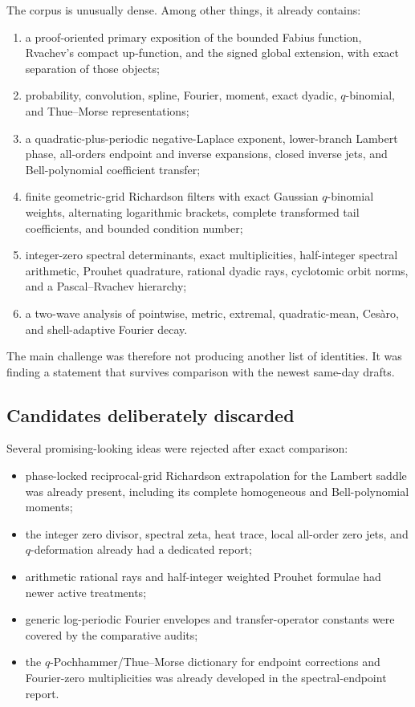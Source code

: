 \documentclass[11pt]{article}
\numberwithin{equation}{section}
\theoremstyle{definition}
\theoremstyle{remark}
\begin{document}
The corpus is unusually dense.  Among other things, it already contains:
\begin{enumerate}
\item a proof-oriented primary exposition of the bounded Fabius function, Rvachev's compact
      up-function, and the signed global extension, with exact separation of those objects;
\item probability, convolution, spline, Fourier, moment, exact dyadic, $q$-binomial, and
      Thue--Morse representations;
\item a quadratic-plus-periodic negative-Laplace exponent, lower-branch Lambert phase,
      all-orders endpoint and inverse expansions, closed inverse jets, and Bell-polynomial
      coefficient transfer;
\item finite geometric-grid Richardson filters with exact Gaussian $q$-binomial weights,
      alternating logarithmic brackets, complete transformed tail coefficients, and bounded
      condition number;
\item integer-zero spectral determinants, exact multiplicities, half-integer spectral
      arithmetic, Prouhet quadrature, rational dyadic rays, cyclotomic orbit norms, and a
      Pascal--Rvachev hierarchy;
\item a two-wave analysis of pointwise, metric, extremal, quadratic-mean, Ces\`aro, and
      shell-adaptive Fourier decay.
\end{enumerate}
The main challenge was therefore not producing another list of identities.  It was finding a
statement that survives comparison with the newest same-day drafts.

\subsection{Candidates deliberately discarded}

Several promising-looking ideas were rejected after exact comparison:
\begin{itemize}
\item phase-locked reciprocal-grid Richardson extrapolation for the Lambert saddle was
      already present, including its complete homogeneous and Bell-polynomial moments;
\item the integer zero divisor, spectral zeta, heat trace, local all-order zero jets, and
      $q$-deformation already had a dedicated report;
\item arithmetic rational rays and half-integer weighted Prouhet formulae had newer active
      treatments;
\item generic log-periodic Fourier envelopes and transfer-operator constants were covered by
      the comparative audits;
\item the $q$-Pochhammer/Thue--Morse dictionary for endpoint corrections and Fourier-zero
      multiplicities was already developed in the spectral-endpoint report.
\end{itemize}
\end{document}
